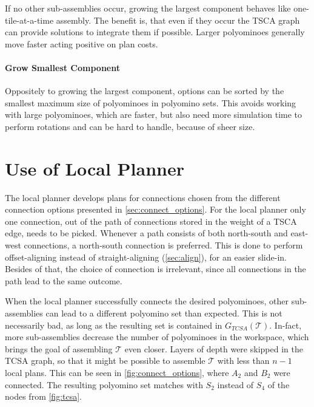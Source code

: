 If no other sub-assemblies occur, growing the largest component behaves like one-tile-at-a-time assembly.
The benefit is, that even if they occur the TSCA graph can provide solutions to integrate them if possible.
Larger polyominoes generally move faster acting positive on plan costs.

\paragraph{Grow Smallest Component}

Oppositely to growing the largest component, options can be sorted by the smallest maximum size of polyominoes in polyomino sets.
This avoids working with large polyominoes, which are faster, but also need more simulation time to perform rotations and can be hard to handle, because of sheer size.


\section{Use of Local Planner}
\label{sec:local_in_global}

The local planner develops plans for connections chosen from the different connection options presented in \autoref{sec:connect_options}.
For the local planner only one connection, out of the path of connections stored in the weight of a TSCA edge, needs to be picked.
Whenever a path consists of both north-south and east-west connections, a north-south connection is preferred.
This is done to perform offset-aligning instead of straight-aligning (\autoref{sec:align}), for an easier slide-in.
Besides of that, the choice of connection is irrelevant, since all connections in the path lead to the same outcome.

When the local planner successfully connects the desired polyominoes, other sub-assemblies can lead to a different polyomino set than expected.
This is not necessarily bad, as long as the resulting set is contained in $G_{\textit{TCSA}}(\mathcal{T})$.
In-fact, more sub-assemblies decrease the number of polyominoes in the workspace, which brings the goal of assembling $\mathcal{T}$ even closer.
Layers of depth were skipped in the TCSA graph, so that it might be possible to assemble $\mathcal{T}$ with less than $n-1$ local plans.
This can be seen in \autoref{fig:connect_options}, where $A_2$ and $B_2$ were connected. 
The resulting polyomino set matches with $S_2$ instead of $S_4$ of the nodes from \autoref{fig:tcsa}.

